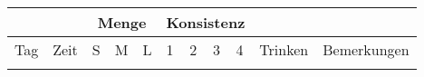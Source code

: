 \documentclass[a4paper]{article}
\begin{document}
\pagestyle{empty}
\centering
\begin{tabular}{p{1cm}|p{1cm}||p{.4cm}|p{.4cm}|p{.4cm}||p{.4cm}|p{.4cm}|p{.4cm}|p{.4cm}||p{2.5cm}|p{4cm}}
  \toprule
  \multicolumn{2}{c}{} & \multicolumn{3}{c}{Menge} & \multicolumn{4}{c}{Konsistenz} & \multicolumn{2}{c}{}\\
  \midrule
  Tag & Zeit & S & M & L & 1 & 2 & 3 & 4 & Trinken & Bemerkungen \\
  \midrule
      &      &   &   &   &   &   &   &   &         &             \\[21cm]
  \bottomrule
\end{tabular}
\end{document}
